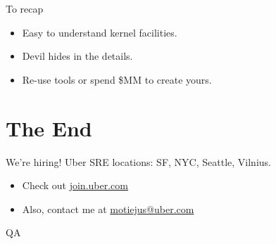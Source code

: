 \documentclass[14pt]{beamer}
\begin{document}
%

\begin{frame}{To recap}
    \begin{itemize}[<+->]
        \item Easy to understand kernel facilities.
        \item Devil hides in the details.
        \item Re-use tools or spend \$MM to create yours.
    \end{itemize}
\end{frame}

\section{The End}
\begin{frame}{We're hiring!}
    \pause
    Uber SRE locations: SF, NYC, Seattle, Vilnius.
    \pause
    \begin{itemize}
        \item Check out \href{http://join.uber.com}{join.uber.com}
        \item Also, contact me at \href{mailto:motiejus@uber.com}{motiejus@uber.com}
    \end{itemize}
\end{frame}

\begin{frame}{QA}
\end{frame}
\end{document}
